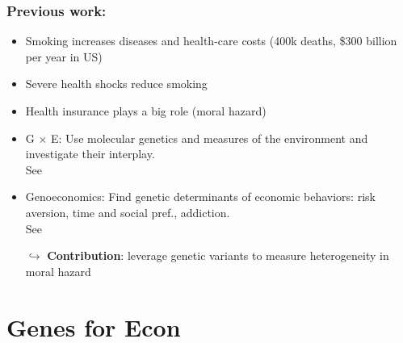 \documentclass[10pt,compress,xcolor=dvipsnames,aspectratio=169]{beamer}    %
\newcounter{ex}
\newcommand{\1}[1]{\mathrm{1\hspace*{-2.5pt}l}[#1]}	%
\begin{document}
\begin{frame}
\frametitle{Previous work:}
\begin{itemize}
	 \item Smoking increases diseases and health-care costs (400k deaths, \$300 billion per year in US) {\scriptsize \cite{USDHHS2014,Goodchild2017,Ma2018,Xu2015}}

	 \smallskip

	 \item Severe health shocks reduce smoking {\scriptsize \cite{Clark2002,Falba2005,Khwaja2006learn,Keenan2009,Sundmacher2012}}

	 \smallskip

	 \item Health insurance plays a big role (moral hazard) {\scriptsize \cite{Richards2014,Marti2017,Einav2013,Einav2018}}

		\smallskip

	 	\item G $\times$ E:
			Use molecular genetics and measures of the environment and investigate their interplay. \\ {\footnotesize See \cite{Caspi2002,Barcellos2018,Belsky2018mobility,Rimfeld2018,Schmitz2017,Schmitz2017vietnam, Rosenquist2015}} %

	\smallskip

	\item Genoeconomics:
			Find genetic determinants of economic behaviors: risk aversion, time and social pref., addiction. \\ {\footnotesize See \cite{Benjamin2007,Cesarini2009,Benjamin2014}}%

	\smallskip
	\pause
	\item[$\hookrightarrow$] \textbf{Contribution}: leverage genetic variants to measure heterogeneity in moral hazard

\end{itemize}
\end{frame}

\section{Genes for Econ}

\end{document}
